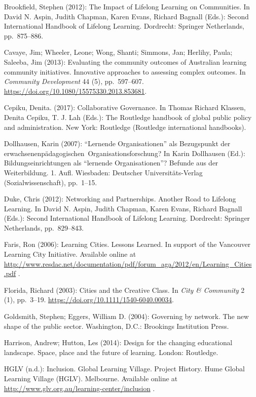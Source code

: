 \documentclass[a4paper,
fontsize=11pt,
oneside,
numbers=noperiodatend,
parskip=half-,
bibliography=totoc,
final
]{scrartcl}
\begin{document}
Brookfield, Stephen (2012): The Impact of Lifelong Learning on
Communities. In David N. Aspin, Judith Chapman, Karen Evans, Richard
Bagnall (Eds.): Second International Handbook of Lifelong Learning.
Dordrecht: Springer Netherlands, pp.~875--886.

Cavaye, Jim; Wheeler, Leone; Wong, Shanti; Simmons, Jan; Herlihy, Paula;
Saleeba, Jim (2013): Evaluating the community outcomes of Australian
learning community initiatives. Innovative approaches to assessing
complex outcomes. In \emph{Community Development} 44 (5), pp.~597--607.
\url{https://doi.org/10.1080/15575330.2013.853681}.

Cepiku, Denita. (2017): Collaborative Governance. In Thomas Richard
Klassen, Denita Cepiku, T. J. Lah (Eds.): The Routledge handbook of
global public policy and administration. New York: Routledge (Routledge
international handbooks).

Dollhausen, Karin (2007): \enquote{Lernende Organisationen} als
Bezugspunkt der erwachsenenpädagogischen~Organisationsforschung? In
Karin Dollhausen (Ed.): Bildungseinrichtungen als \enquote{lernende
Organisationen}? Befunde aus der Weiterbildung. 1. Aufl. Wiesbaden:
Deutscher Universitäts-Verlag (Sozialwissenschaft), pp.~1--15.

Duke, Chris (2012): Networking and Partnerships. Another Road to
Lifelong Learning. In David N. Aspin, Judith Chapman, Karen Evans,
Richard Bagnall (Eds.): Second International Handbook of Lifelong
Learning. Dordrecht: Springer Netherlands, pp.~829--843.

Faris, Ron (2006): Learning Cities. Lessons Learned. In support of the
Vancouver Learning City Initiative. Available online at
\url{http://www.resdac.net/documentation/pdf/forum_aga/2012/en/Learning_Cities.pdf}
.

Florida, Richard (2003): Cities and the Creative Class. In \emph{City \&
Community} 2 (1), pp.~3--19.
\url{https://doi.org/10.1111/1540-6040.00034}.

Goldsmith, Stephen; Eggers, William D. (2004): Governing by network. The
new shape of the public sector. Washington, D.C.: Brookings Institution
Press.

Harrison, Andrew; Hutton, Les (2014): Design for the changing
educational landscape. Space, place and the future of learning. London:
Routledge.

HGLV (n.d.): Inclusion. Global Learning Village. Project History. Hume
Global Learning Village (HGLV). Melbourne. Available online at
\url{http://www.glv.org.au/learning-center/inclusion} .
\end{document}
